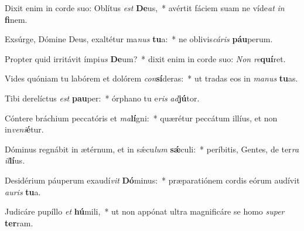 \item Dixit enim in corde suo: Oblítus \textit{est} \textbf{De}us,~* avértit fáciem suam ne víde\textit{at} \textit{in} \textbf{fi}nem.
\item Exsúrge, Dómine Deus, exaltétur ma\textit{nus} \textbf{tu}a:~* ne oblivis\textit{cá}\textit{ris} \textbf{páu}perum.
\item Propter quid irritávit ímpi\textit{us} \textbf{De}um?~* dixit enim in corde suo: \textit{Non} \textit{re}\textbf{quí}ret.
\item Vides quóniam tu labórem et dolórem \textit{con}\textbf{sí}deras:~* ut tradas eos in \textit{ma}\textit{nus} \textbf{tu}as.
\item Tibi derelíctus \textit{est} \textbf{pau}per:~* órphano tu e\textit{ris} \textit{ad}\textbf{jú}tor.
\item Cóntere bráchium peccatóris et \textit{ma}\textbf{lí}gni:~* quærétur peccátum illíus, et non in\textit{ve}\textit{ni}\textbf{é}tur.
\item Dóminus regnábit in ætérnum, et in sǽcu\textit{lum} \textbf{sǽ}culi:~* períbitis, Gentes, de ter\textit{ra} \textit{il}\textbf{lí}us.
\item Desidérium páuperum exaudí\textit{vit} \textbf{Dó}minus:~* præparatiónem cordis eórum audívit \textit{au}\textit{ris} \textbf{tu}a.
\item Judicáre pupíllo \textit{et} \textbf{hú}mili,~* ut non appónat ultra magnificáre se homo \textit{su}\textit{per} \textbf{ter}ram.
